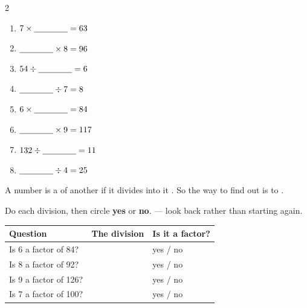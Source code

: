 \documentclass[12pt,a4paper]{article}
\begin{document}
\vspace{4pt}
\begin{multicols}{2}
\begin{enumerate}[label=(\alph*), itemsep=12pt]
  \item $7 \times \blank[1.4cm] = 63$
  \item $\blank[1.4cm] \times 8 = 96$
  \item $54 \div \blank[1.4cm] = 6$
  \item $\blank[1.4cm] \div 7 = 8$
  \item $6 \times \blank[1.4cm] = 84$
  \item $\blank[1.4cm] \times 9 = 117$
  \item $132 \div \blank[1.4cm] = 11$
  \item $\blank[1.4cm] \div 4 = 25$
\end{enumerate}
\end{multicols}


\begin{remember}
  A number is a  of another if it divides into it .
  So the way to find out is to .
\end{remember}

\noindent Do each division, then circle \textbf{yes} or \textbf{no}.
 --- look back rather
than starting again.

\vspace{10pt}
\noindent
\begin{tabularx}{\textwidth}{|X|p{4.4cm}|p{3.4cm}|}
  \hline
  \textbf{Question} & \textbf{The division} & \textbf{Is it a factor?} \\
  \hline
  Is 6 a factor of 84?  \rule[-0.8em]{0pt}{2.3em} & & yes \quad / \quad no \\ \hline
  Is 8 a factor of 92?  \rule[-0.8em]{0pt}{2.3em} & & yes \quad / \quad no \\ \hline
  Is 9 a factor of 126? \rule[-0.8em]{0pt}{2.3em} & & yes \quad / \quad no \\ \hline
  Is 7 a factor of 100? \rule[-0.8em]{0pt}{2.3em} & & yes \quad / \quad no \\ \hline
\end{tabularx}
\end{document}
